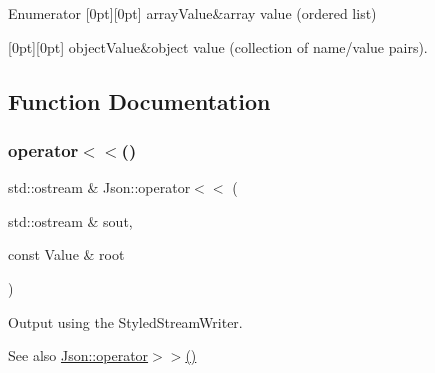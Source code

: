 \begin{DoxyEnumFields}{Enumerator}
[0pt][0pt]{}\mbox{\label{namespace_json_a7d654b75c16a57007925868e38212b4eadc8f264f36b55b063c78126b335415f4}} 
array\+Value&array value (ordered list) \\
\hline

[0pt][0pt]{}\mbox{\label{namespace_json_a7d654b75c16a57007925868e38212b4eae8386dcfc36d1ae897745f7b4f77a1f6}} 
object\+Value&object value (collection of name/value pairs). \\
\hline

\end{DoxyEnumFields}


\subsection{Function Documentation}
\mbox{\label{namespace_json_a87bc83d7e90fc666d28aa16727deda2f}} 
\subsubsection{\texorpdfstring{operator$<$$<$()}{operator<<()}}
{\footnotesize\ttfamily std\+::ostream \& Json\+::operator$<$$<$ (\begin{DoxyParamCaption}\item[{std\+::ostream \&}]{sout,  }\item[{const Value \&}]{root }\end{DoxyParamCaption})}



Output using the Styled\+Stream\+Writer. 

\begin{DoxySeeAlso}{See also}
\hyperlink{namespace_json_a4d245ef719cc0853e8e78eb5f99c16e5}{Json\+::operator$>$$>$()} 
\end{DoxySeeAlso}
\mbox{\label{namespace_json_a4d245ef719cc0853e8e78eb5f99c16e5}} 
